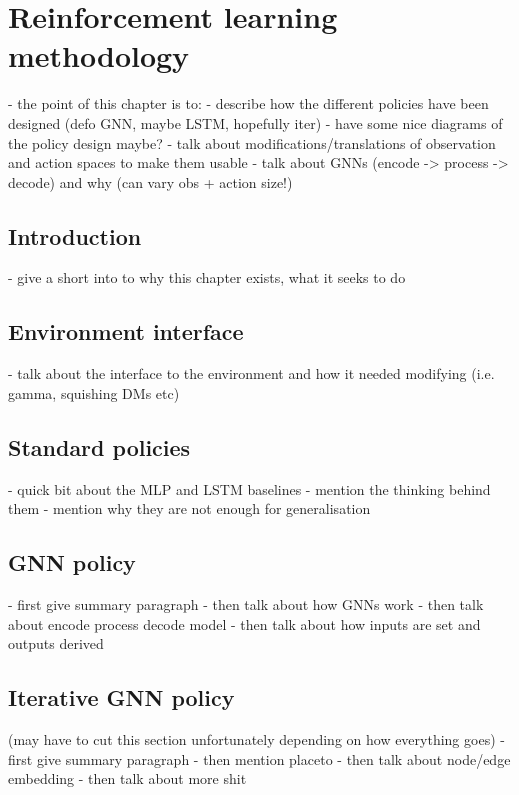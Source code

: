 \chapter{Reinforcement learning methodology}
\label{chapter:learning}

- the point of this chapter is to:
  - describe how the different policies have been designed (defo GNN, maybe LSTM, hopefully iter)
  - have some nice diagrams of the policy design maybe?
  - talk about modifications/translations of observation and action spaces to make them usable
  - talk about GNNs (encode -> process -> decode) and why (can vary obs + action size!)
  
 \section{Introduction}
 
- give a short into to why this chapter exists, what it seeks to do

\section{Environment interface}

- talk about the interface to the environment and how it needed modifying (i.e. gamma, squishing DMs etc)

\section{Standard policies}

- quick bit about the MLP and LSTM baselines
- mention the thinking behind them
- mention why they are not enough for generalisation

\section{GNN policy}

- first give summary paragraph
- then talk about how GNNs work
- then talk about encode process decode model
- then talk about how inputs are set and outputs derived

\section{Iterative GNN policy}
(may have to cut this section unfortunately depending on how everything goes)
- first give summary paragraph
- then mention placeto
- then talk about node/edge embedding
- then talk about more shit
